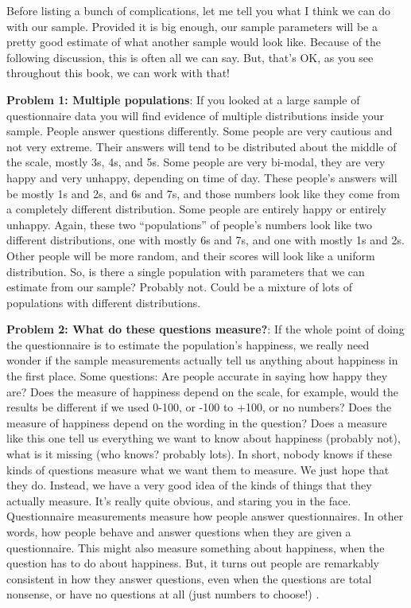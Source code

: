 \documentclass[
]{book}
\begin{document}
Before listing a bunch of complications, let me tell you what I think we can do with our sample. Provided it is big enough, our sample parameters will be a pretty good estimate of what another sample would look like. Because of the following discussion, this is often all we can say. But, that's OK, as you see throughout this book, we can work with that!

\textbf{Problem 1: Multiple populations}: If you looked at a large sample of questionnaire data you will find evidence of multiple distributions inside your sample. People answer questions differently. Some people are very cautious and not very extreme. Their answers will tend to be distributed about the middle of the scale, mostly 3s, 4s, and 5s. Some people are very bi-modal, they are very happy and very unhappy, depending on time of day. These people's answers will be mostly 1s and 2s, and 6s and 7s, and those numbers look like they come from a completely different distribution. Some people are entirely happy or entirely unhappy. Again, these two ``populations'' of people's numbers look like two different distributions, one with mostly 6s and 7s, and one with mostly 1s and 2s. Other people will be more random, and their scores will look like a uniform distribution. So, is there a single population with parameters that we can estimate from our sample? Probably not. Could be a mixture of lots of populations with different distributions.

\textbf{Problem 2: What do these questions measure?}: If the whole point of doing the questionnaire is to estimate the population's happiness, we really need wonder if the sample measurements actually tell us anything about happiness in the first place. Some questions: Are people accurate in saying how happy they are? Does the measure of happiness depend on the scale, for example, would the results be different if we used 0-100, or -100 to +100, or no numbers? Does the measure of happiness depend on the wording in the question? Does a measure like this one tell us everything we want to know about happiness (probably not), what is it missing (who knows? probably lots). In short, nobody knows if these kinds of questions measure what we want them to measure. We just hope that they do. Instead, we have a very good idea of the kinds of things that they actually measure. It's really quite obvious, and staring you in the face. Questionnaire measurements measure how people answer questionnaires. In other words, how people behave and answer questions when they are given a questionnaire. This might also measure something about happiness, when the question has to do about happiness. But, it turns out people are remarkably consistent in how they answer questions, even when the questions are total nonsense, or have no questions at all (just numbers to choose!) \citet{maul_rethinking_2017}.
\end{document}
